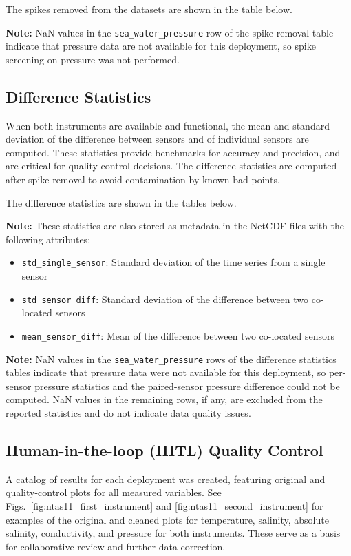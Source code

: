 The spikes removed from the datasets are shown in the table below.



\textbf{Note:} NaN values in the \texttt{sea\_water\_pressure} row of the spike-removal table indicate that pressure data are not available for this deployment, so spike screening on pressure was not performed.

\subsection{Difference Statistics}
When both instruments are available and functional, 
the mean and standard deviation of the difference between sensors and of individual sensors are computed. 
These statistics provide benchmarks for accuracy and precision, and are critical for quality control decisions.
The difference statistics are computed after spike removal to avoid contamination by known bad points.

The difference statistics are shown in the tables below.



\textbf{Note:} These statistics are also stored as metadata in the NetCDF files with the following attributes:
\begin{itemize}
\item \texttt{std\_single\_sensor}: Standard deviation of the time series from a single sensor
\item \texttt{std\_sensor\_diff}: Standard deviation of the difference between two co-located sensors
\item \texttt{mean\_sensor\_diff}: Mean of the difference between two co-located sensors
\end{itemize}

\textbf{Note:} NaN values in the \texttt{sea\_water\_pressure} rows of the difference statistics tables indicate that pressure data were not available for this deployment, so per-sensor pressure statistics and the paired-sensor pressure difference could not be computed. NaN values in the remaining rows, if any, are excluded from the reported statistics and do not indicate data quality issues.

\subsection{Human-in-the-loop (HITL) Quality Control}
A catalog of results for each deployment was created, featuring original and quality-control plots for all measured variables. 
See Figs.~\ref{fig:ntas11_first_instrument} and \ref{fig:ntas11_second_instrument} for examples of the original and cleaned plots for temperature, salinity, absolute salinity, conductivity, and pressure for both instruments.
These serve as a basis for collaborative review and further data correction.

